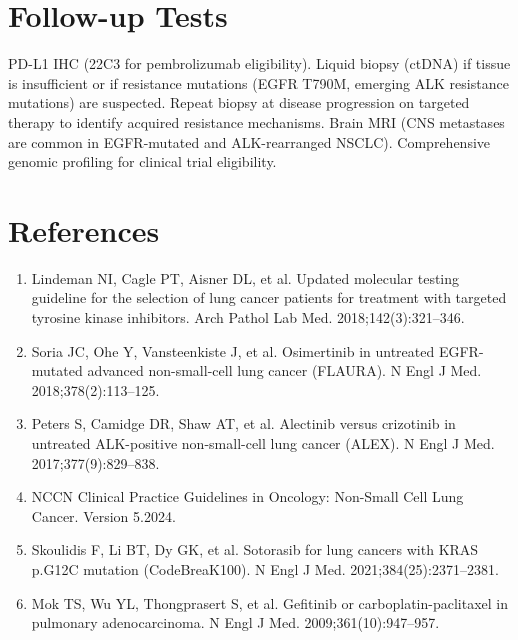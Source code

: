 \section*{Follow-up Tests}
PD-L1 IHC (22C3 for pembrolizumab eligibility). Liquid biopsy (ctDNA) if tissue is insufficient or if resistance mutations (EGFR T790M, emerging ALK resistance mutations) are suspected. Repeat biopsy at disease progression on targeted therapy to identify acquired resistance mechanisms. Brain MRI (CNS metastases are common in EGFR-mutated and ALK-rearranged NSCLC). Comprehensive genomic profiling for clinical trial eligibility.

\section*{References}
\begin{enumerate}
  \item Lindeman NI, Cagle PT, Aisner DL, et al. Updated molecular testing guideline for the selection of lung cancer patients for treatment with targeted tyrosine kinase inhibitors. Arch Pathol Lab Med. 2018;142(3):321--346.
  \item Soria JC, Ohe Y, Vansteenkiste J, et al. Osimertinib in untreated EGFR-mutated advanced non-small-cell lung cancer (FLAURA). N Engl J Med. 2018;378(2):113--125.
  \item Peters S, Camidge DR, Shaw AT, et al. Alectinib versus crizotinib in untreated ALK-positive non-small-cell lung cancer (ALEX). N Engl J Med. 2017;377(9):829--838.
  \item NCCN Clinical Practice Guidelines in Oncology: Non-Small Cell Lung Cancer. Version 5.2024.
  \item Skoulidis F, Li BT, Dy GK, et al. Sotorasib for lung cancers with KRAS p.G12C mutation (CodeBreaK100). N Engl J Med. 2021;384(25):2371--2381.
  \item Mok TS, Wu YL, Thongprasert S, et al. Gefitinib or carboplatin-paclitaxel in pulmonary adenocarcinoma. N Engl J Med. 2009;361(10):947--957.
\end{enumerate}

\clearpage
